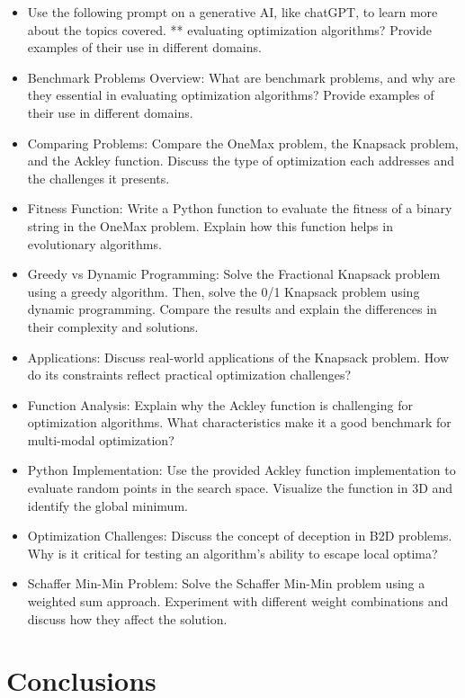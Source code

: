 \documentclass[
  letterpaper,
  DIV=11,
  numbers=noendperiod]{scrreprt}
\providecommand{\tightlist}{%
  \setlength{\itemsep}{0pt}\setlength{\parskip}{0pt}}\usepackage{longtable,booktabs,array}
\begin{document}
\begin{itemize}
\tightlist
\item
  Use the following prompt on a generative AI, like chatGPT, to learn
  more about the topics covered. ** evaluating optimization algorithms?
  Provide examples of their use in different domains.
\item
  Benchmark Problems Overview: What are benchmark problems, and why are
  they essential in evaluating optimization algorithms? Provide examples
  of their use in different domains.
\item
  Comparing Problems: Compare the OneMax problem, the Knapsack problem,
  and the Ackley function. Discuss the type of optimization each
  addresses and the challenges it presents.
\item
  Fitness Function: Write a Python function to evaluate the fitness of a
  binary string in the OneMax problem. Explain how this function helps
  in evolutionary algorithms.
\item
  Greedy vs Dynamic Programming: Solve the Fractional Knapsack problem
  using a greedy algorithm. Then, solve the 0/1 Knapsack problem using
  dynamic programming. Compare the results and explain the differences
  in their complexity and solutions.
\item
  Applications: Discuss real-world applications of the Knapsack problem.
  How do its constraints reflect practical optimization challenges?
\item
  Function Analysis: Explain why the Ackley function is challenging for
  optimization algorithms. What characteristics make it a good benchmark
  for multi-modal optimization?
\item
  Python Implementation: Use the provided Ackley function implementation
  to evaluate random points in the search space. Visualize the function
  in 3D and identify the global minimum.
\item
  Optimization Challenges: Discuss the concept of deception in B2D
  problems. Why is it critical for testing an algorithm's ability to
  escape local optima?
\item
  Schaffer Min-Min Problem: Solve the Schaffer Min-Min problem using a
  weighted sum approach. Experiment with different weight combinations
  and discuss how they affect the solution.
\end{itemize}


\chapter{Conclusions}\label{conclusions-2}
\end{document}
